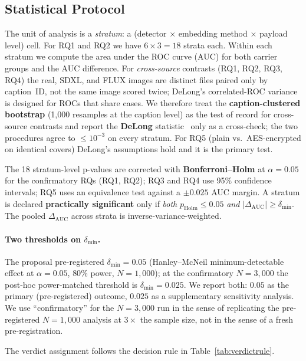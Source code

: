 \documentclass[10pt,twocolumn,a4paper]{article}
\begin{document}
\subsection{Statistical Protocol}
\label{sec:stats}

The unit of analysis is a \emph{stratum}: a (detector $\times$ embedding method $\times$ payload level) cell. For RQ1 and RQ2 we have $6\!\times\!3\!=\!18$ strata each. Within each stratum we compute the area under the ROC curve (AUC) for both carrier groups and the AUC difference. For \emph{cross-source} contrasts (RQ1, RQ2, RQ3, RQ4) the real, SDXL, and FLUX images are distinct files paired only by caption~ID, not the same image scored twice; DeLong's correlated-ROC variance is designed for ROCs that share cases. We therefore treat the \textbf{caption-clustered bootstrap} (1{,}000 resamples at the caption level) as the test of record for cross-source contrasts and report the \textbf{DeLong} statistic~\cite{delong1988} only as a cross-check; the two procedures agree to $\leq\!10^{-3}$ on every stratum. For RQ5 (plain vs.\ AES-encrypted on identical covers) DeLong's assumptions hold and it is the primary test.

The 18 stratum-level p-values are corrected with \textbf{Bonferroni--Holm} at $\alpha\!=\!0.05$ for the confirmatory RQs (RQ1, RQ2); RQ3 and RQ4 use 95\% confidence intervals; RQ5 uses an equivalence test against a $\pm0.025$ AUC margin. A stratum is declared \textbf{practically significant} only if \emph{both} $p_\text{Holm}\!\leq\!0.05$ \emph{and} $|\Delta_\text{AUC}|\!\geq\!\delta_\text{min}$. The pooled $\Delta_\text{AUC}$ across strata is inverse-variance-weighted.

\paragraph{Two thresholds on $\delta_\text{min}$.} The proposal pre-registered $\delta_\text{min}\!=\!0.05$ (Hanley--McNeil minimum-detectable effect at $\alpha\!=\!0.05$, $80\%$ power, $N\!=\!1{,}000$); at the confirmatory $N\!=\!3{,}000$ the post-hoc power-matched threshold is $\delta_\text{min}\!=\!0.025$. We report both: $0.05$ as the primary (pre-registered) outcome, $0.025$ as a supplementary sensitivity analysis. We use ``confirmatory'' for the $N\!=\!3{,}000$ run in the sense of replicating the pre-registered $N\!=\!1{,}000$ analysis at $3\!\times\!$ the sample size, not in the sense of a fresh pre-registration.

The verdict assignment follows the decision rule in Table~\ref{tab:verdictrule}.
\end{document}
